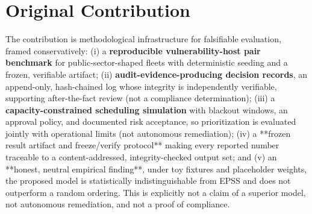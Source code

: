 \section{Original Contribution}

The contribution is methodological infrastructure for falsifiable evaluation,
framed conservatively: (i) a \textbf{reproducible vulnerability-host pair benchmark} for
public-sector-shaped fleets with deterministic seeding and a frozen, verifiable
artifact; (ii) \textbf{audit-evidence-producing decision records}, an append-only,
hash-chained log whose integrity is independently verifiable, supporting
after-the-fact review (not a compliance determination); (iii) a
\textbf{capacity-constrained scheduling simulation} with blackout windows, an approval
policy, and documented risk acceptance, so prioritization is evaluated jointly with
operational limits (not autonomous remediation); (iv) a **frozen result artifact
and freeze/verify protocol** making every reported number traceable to a
content-addressed, integrity-checked output set; and (v) an **honest, neutral
empirical finding**, under toy fixtures and placeholder weights, the proposed model
is statistically indistinguishable from EPSS and does not outperform a random
ordering. This is explicitly not a claim of a superior model, not autonomous
remediation, and not a proof of compliance.
